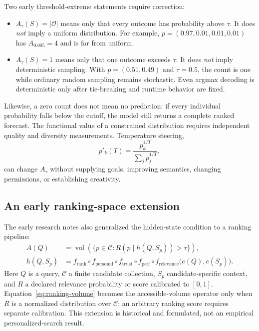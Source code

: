Two early threshold-extreme statements require correction:
\begin{itemize}
  \item $A_\tau(S)=|\mathcal O|$ means only that every outcome has probability above $\tau$. It does \emph{not} imply a uniform distribution. For example, $p=(0.97,0.01,0.01,0.01)$ has $A_{0.005}=4$ and is far from uniform.
  \item $A_\tau(S)=1$ means only that one outcome exceeds $\tau$. It does \emph{not} imply deterministic sampling. With $p=(0.51,0.49)$ and $\tau=0.5$, the count is one while ordinary random sampling remains stochastic. Even argmax decoding is deterministic only after tie-breaking and runtime behavior are fixed.
\end{itemize}
Likewise, a zero count does not mean no prediction: if every individual probability falls below the cutoff, the model still returns a complete ranked forecast. The functional value of a constrained distribution requires independent quality and diversity measurements. Temperature steering,
\begin{equation}
p'_k(T)=\frac{p_k^{1/T}}{\sum_jp_j^{1/T}},
\label{eq:temperature}
\end{equation}
can change $A_\tau$ without supplying goals, improving semantics, changing permissions, or establishing creativity.

\subsection{An early ranking-space extension}
The early research notes also generalized the hidden-state condition to a ranking pipeline:
\begin{align}
A(Q)&=\operatorname{vol}\!\left(\{p\in\mathcal C:
R\!\left(p\mid h(Q,S_p)\right)>\tau\}\right),\label{eq:ranking-volume}\\
h(Q,S_p)&=f_{\mathrm{rank}}\circ f_{\mathrm{personal}}\circ f_{\mathrm{trust}}
\circ f_{\mathrm{perf}}\circ f_{\mathrm{relevance}}
\bigl(e(Q),e(S_p)\bigr).\label{eq:ranking-hidden}
\end{align}
Here $Q$ is a query, $\mathcal C$ a finite candidate collection, $S_p$ candidate-specific context, and $R$ a declared relevance probability or score calibrated to $[0,1]$. Equation~\eqref{eq:ranking-volume} becomes the accessible-volume operator only when $R$ is a normalized distribution over $\mathcal C$; an arbitrary ranking score requires separate calibration. This extension is historical and formulated, not an empirical personalized-search result.

